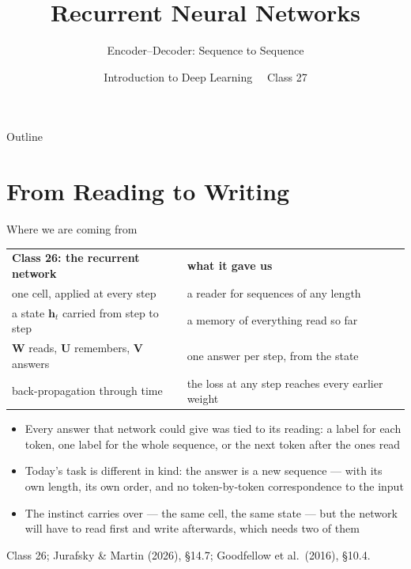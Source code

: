 \documentclass[aspectratio=169, 11pt]{beamer}
\title{Recurrent Neural Networks}
\subtitle{Encoder--Decoder: Sequence to Sequence}
\author{Introduction to Deep Learning \ \textperiodcentered\ Class 27}
\institute{}
\date{}
\newcommand{\srcline}[1]{%
  \par\vspace{0.25em}%
  {\scriptsize\color{mcMuted}\hfill #1\par}}
\begin{document}
\maketitle

\begin{frame}{Outline}
  \tableofcontents
\end{frame}

\section{From Reading to Writing}

\begin{frame}{Where we are coming from}
  \vspace{-0.3em}
  {\scriptsize
  \renewcommand{\arraystretch}{1.3}
  \begin{tabular}{@{}l@{\hspace{1.2em}}l@{}}
    \textbf{Class 26: the recurrent network} & \textbf{what it gave us}\\
    one cell, applied at every step & a reader for sequences of any length\\
    a state $\mathbf{h}_t$ carried from step to step & a memory of everything read so far\\
    $\mathbf{W}$ reads, $\mathbf{U}$ remembers, $\mathbf{V}$ answers & one answer per step, from the state\\
    back-propagation through time & the loss at any step reaches every earlier weight\\
  \end{tabular}}
  \vspace{0.4em}

  {\footnotesize
  \begin{itemize}\itemsep0.2em
    \item Every answer that network could give was tied to its reading:
          a label \alert{for each} token, one label \alert{for the whole}
          sequence, or the \alert{next} token after the ones read
    \item Today's task is different in kind: the answer is a
          \alert{new sequence} --- with its own length, its own order, and
          no token-by-token correspondence to the input
    \item The instinct carries over --- the same cell, the same state ---
          but the network will have to \alert{read first and write
          afterwards}, which needs two of them
  \end{itemize}}
  \srcline{Class 26; Jurafsky \& Martin (2026), \S14.7; Goodfellow et al.\ (2016), \S10.4.}
\end{frame}
\end{document}
